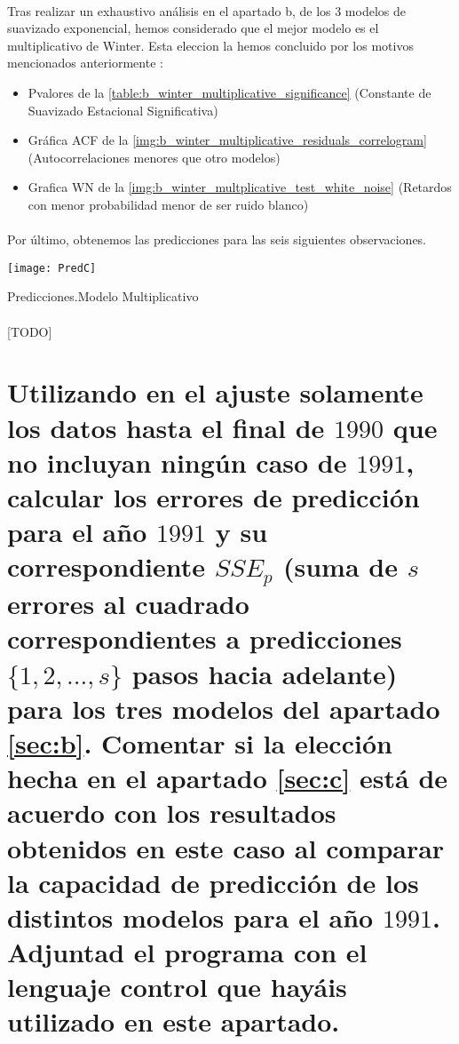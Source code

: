 \documentclass[a4paper, spanish]{article}
\begin{document}
    \paragraph{}
    Tras realizar un exhaustivo análisis en el apartado b, de los 3 modelos de suavizado exponencial, hemos considerado que el mejor modelo es el multiplicativo de Winter.
    Esta eleccion la hemos concluido por los motivos mencionados anteriormente :

    \begin{itemize}
      \item Pvalores de la \autoref{table:b_winter_multiplicative_significance} (Constante de Suavizado Estacional Significativa)
      \item Gráfica ACF de la \autoref{img:b_winter_multiplicative_residuals_correlogram} (Autocorrelaciones menores que otro modelos)
      \item Grafica WN de la \autoref{img:b_winter_multplicative_test_white_noise} (Retardos con menor probabilidad menor de ser ruido blanco)
    \end{itemize}

    \paragraph{}
    Por último, obtenemos las predicciones para las seis siguientes observaciones.

    \begin{table}[htb!]
      \centering
      \texttt{[image: PredC]}
      \caption{Predicciones.Modelo Multiplicativo}
      \label{}
    \end{table}

    \paragraph{}
    [TODO]

  \section{Utilizando en el ajuste solamente los datos hasta el final de $1990$ que no incluyan ningún caso de $1991$, calcular los errores de predicción para el año $1991$ y su correspondiente $SSE_p$ (suma de $s$ errores al cuadrado correspondientes a predicciones $\{1, 2, ..., s\}$ pasos hacia adelante) para los tres modelos del apartado \ref{sec:b}. Comentar si la elección hecha en el apartado \ref{sec:c} está de acuerdo con los resultados obtenidos en este caso al comparar la capacidad de predicción de los distintos modelos para el año $1991$. Adjuntad el programa con el lenguaje control que hayáis utilizado en este apartado.}
  \label{sec:d}
\end{document}
